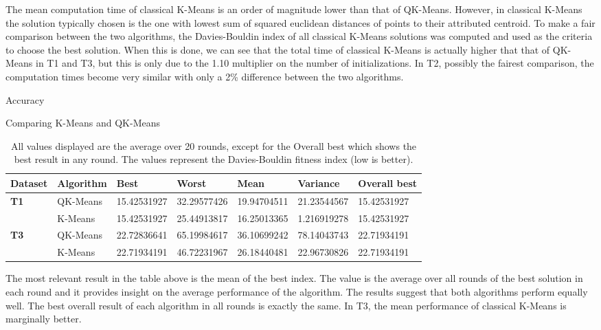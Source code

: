 The mean computation time of classical K-Means is an order of magnitude lower than that of QK-Means. However, in classical K-Means the solution typically chosen is the one with lowest sum of squared euclidean distances of points to their attributed centroid. To make a fair comparison between the two algorithms, the Davies-Bouldin index of all classical K-Means solutions was computed and used as the criteria to choose the best solution. When this is done, we can see that the total time of classical K-Means is actually higher that that of QK-Means in T1 and T3, but this is only due to the 1.10 multiplier on the number of initializations. In T2, possibly the fairest comparison, the computation times become very similar with only a 2\% difference between the two algorithms.

Accuracy

Comparing K-Means and QK-Means


\begin{table}[h]
\caption{All values displayed are the average over 20 rounds, except for the Overall best which shows the best result in any round. The values represent the Davies-Bouldin fitness index (low is better).}
\begin{tabular}{|l|l|l|l|l|l|l|}
\hline
\textbf{Dataset} & \textbf{Algorithm} & \textbf{Best} & \textbf{Worst} & \textbf{Mean} & \textbf{Variance} & \textbf{Overall best} \\ \hline
\textbf{T1}      & QK-Means           & 15.42531927   & 32.29577426    & 19.94704511   & 21.23544567       & 15.42531927           \\ \cline{2-7} 
\textbf{}        & K-Means            & 15.42531927   & 25.44913817    & 16.25013365   & 1.216919278       & 15.42531927           \\ \hline
\textbf{T3}      & QK-Means           & 22.72836641   & 65.19984617    & 36.10699242   & 78.14043743       & 22.71934191           \\ \cline{2-7} 
\textbf{}        & K-Means            & 22.71934191   & 46.72231967    & 26.18440481   & 22.96730826       & 22.71934191           \\ \hline
\end{tabular}
\end{table}

The most relevant result in the table above is the mean of the best index. The value is the average over all rounds of the best solution in each round and it provides insight on the average performance of the algorithm. The results suggest that both algorithms perform equally well. The best overall result of each algorithm in all rounds is exactly the same. In T3, the mean performance of classical K-Means is marginally better.

